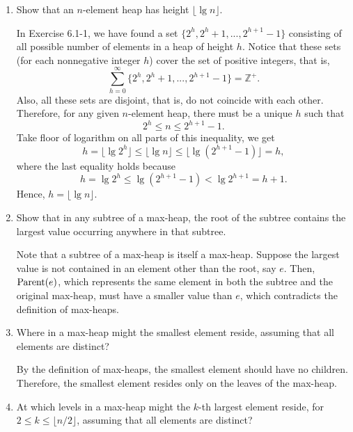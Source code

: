 \documentclass[12pt,reqno]{amsart}
\newif\ifanswer
\begin{document}
\begin{enumerate}[1.]
\begin{enumerate}[(i)]
\end{enumerate}
\vspace{1cm}



\item Show that an $n$-element heap has height $\lfloor\lg{n}\rfloor$.

\ifanswer
{}
In Exercise 6.1-1, we have found a set $\{2^h, 2^h+1, ..., 2^{h+1}-1\}$ consisting of all possible number of elements in a heap of height $h$. Notice that these sets (for each nonnegative integer $h$) cover the set of positive integers, that is,
$$
\sum_{h=0}^{\infty}{\{2^h, 2^h+1, ..., 2^{h+1}-1\}} = \mathbb{Z}^{+}.
$$
Also, all these sets are disjoint, that is, do not coincide with each other. Therefore, for any given $n$-element heap, there must be a unique $h$ such that
$$
2^h \leq n \leq 2^{h+1} - 1.
$$
Take floor of logarithm on all parts of this inequality, we get
$$
h = \lfloor \lg{2^h} \rfloor \leq \lfloor \lg{n} \rfloor \leq \lfloor \lg{(2^{h+1}-1)} \rfloor = h,
$$
where the last equality holds because
$$
h = \lg{2^h} \leq \lg{(2^{h+1}-1)} < \lg{2^{h+1}} = h+1.
$$
Hence, $h = \lfloor \lg{n} \rfloor$.
\vspace{1cm}



\item Show that in any subtree of a max-heap, the root of the subtree contains the largest value occurring anywhere in that subtree.

\ifanswer
{}
Note that a subtree of a max-heap is itself a max-heap. Suppose the largest value is not contained in an element other than the root, say $e$. Then, $\textup{Parent}(e)$, which represents the same element in both the subtree and the original max-heap, must have a smaller value than $e$, which contradicts the definition of max-heaps.
\vspace{1cm}



\item Where in a max-heap might the smallest element reside, assuming that all elements are distinct?

\ifanswer
{}
By the definition of max-heaps, the smallest element should have no children. Therefore, the smallest element resides only on the leaves of the max-heap.
\vspace{1cm}



\item At which levels in a max-heap might the $k$-th largest element reside, for $2\leq k\leq \lfloor n/2\rfloor$, assuming that all elements are distinct?


\end{enumerate}
\end{document}
